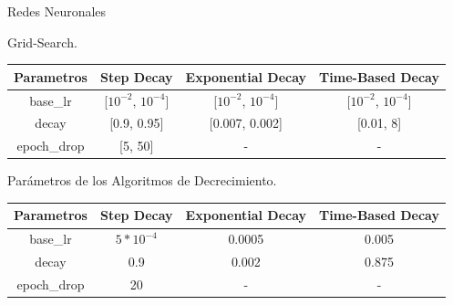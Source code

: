 \documentclass{beamer}
\begin{document}
\begin{frame}{Redes Neuronales}
    
    Grid-Search.
    \begin{table}[h!]
    \begin{center}
        \begin{tabular}{c|c|c|c}
        \hline

        Parametros & Step Decay & Exponential Decay  & Time-Based Decay\\ \hline
        base\_lr & [$10^{-2}$, $10^{-4}]$ & [$10^{-2}$, $10^{-4}$] & [$10^{-2}$, $10^{-4}$]\\  
        decay & [0.9, 0.95] & [0.007, 0.002] & [0.01, 8]\\ 
        epoch\_drop & [5, 50] & - & -\\ 
        \hline
        \end{tabular}
    \end{center}
    \end{table}

    Par\'ametros de los Algoritmos de Decrecimiento.
    \begin{table}[h!]
        \begin{center}
        
        \begin{tabular}{c|c|c|c}
        \hline

        Parametros & Step Decay & Exponential Decay  & Time-Based Decay\\ \hline
        base\_lr & $5*10^{-4}$ & 0.0005 & 0.005 \\  
        decay & 0.9 & 0.002 & 0.875 \\ 
        epoch\_drop & 20 & - & -\\ 
        \hline
        \end{tabular}
    \end{center}
    \end{table}

\end{frame}
\end{document}
